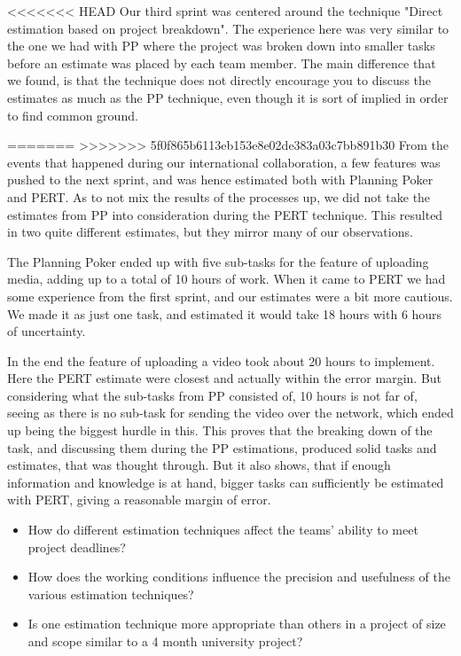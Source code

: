 <<<<<<< HEAD
Our third sprint was centered around the technique "Direct estimation based on project breakdown". The experience here was very similar to the one we had with PP where the project was broken down into smaller tasks before an estimate was placed by each team member. The main difference that we found, is that the technique does not directly encourage you to discuss the estimates as much as the PP technique, even though it is sort of implied in order to find common ground.


=======
>>>>>>> 5f0f865b6113eb153e8e02de383a03c7bb891b30
From the events that happened during our international collaboration, a few features was pushed to the next sprint, and was hence estimated both with Planning Poker and PERT. As to not mix the results of the processes up, we did not take the estimates from PP into consideration during the PERT technique. This resulted in two quite different estimates, but they mirror many of our observations.\

The Planning Poker ended up with five sub-tasks for the feature of uploading media, adding up to a total of 10 hours of work. When it came to PERT we had some experience from the first sprint, and our estimates were a bit more cautious. We made it as just one task, and estimated it would take 18 hours with 6 hours of uncertainty.\

In the end the feature of uploading a video took about 20 hours to implement. Here the PERT estimate were closest and actually within the error margin. But considering what the sub-tasks from PP consisted of, 10 hours is not far of, seeing as there is no sub-task for sending the video over the network, which ended up being the biggest hurdle in this. This proves that the breaking down of the task, and discussing them during the PP estimations, produced solid tasks and estimates, that was thought through. But it also shows, that if enough information and knowledge is at hand, bigger tasks can sufficiently be estimated with PERT, giving a reasonable margin of error. \


\begin{itemize}
\item How do different estimation techniques affect the teams' ability to meet project deadlines?

\item How does the working conditions influence the precision and usefulness of the various estimation techniques?	

\item Is one estimation technique more appropriate than others in a project of size and scope similar to a 4 month university project?
\end{itemize}
















